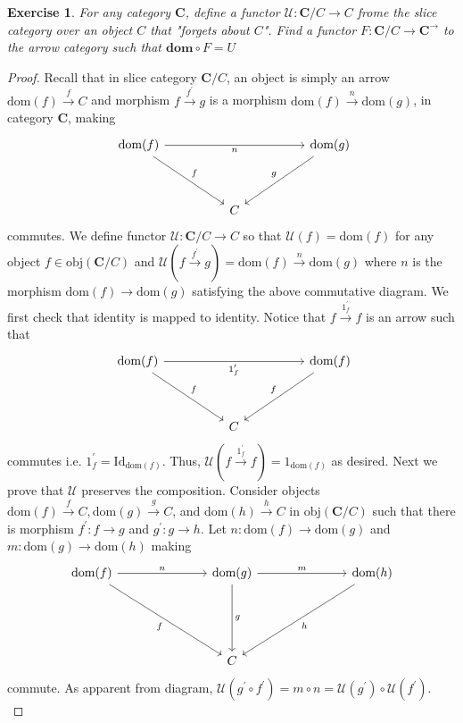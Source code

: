 \documentclass[a4paper, 11pt]{book}
\theoremstyle{plain}
\newtheorem{exercise}{Exercise}[chapter]
\theoremstyle{plain}
\newcommand{\mb}{\mathbf}
\newcommand{\arr}{\rightarrow}
\newcommand{\dom}{\text{dom}}
\newcommand{\p}{\prime}
\newcommand{\obj}{\text{obj}}
\newcommand{\id}{\text{Id}}
\newcommand{\mc}{\mathcal}
\newcommand{\warr}{\xrightarrow}
\begin{document}
  \begin{exercise}
    For any category $\mb{C}$, define a functor $\mc{U}:\mb{C}/C \arr C$ frome the slice category over an object $C$ that "forgets about $C$". Find a functor $F: \mb{C}/C \arr \mb{C}^\arr$ to the arrow category such that $\mb{dom} \circ F=U$
  \end{exercise}
  \begin{proof}
    Recall that in slice category $\mb{C}/C$, an object is simply an arrow $\dom(f) \warr{f} C$ and morphism $f \warr{f^\p} g$ is a morphism $\dom(f) \warr{n} \dom(g)$, in category $\mb{C}$, making  
    \[\begin{tikzcd}
      {\ \text{dom}(f)} &&&& { \text{dom}(g)} \\
      \\
      && { C}
      \arrow["f", from=1-1, to=3-3]
      \arrow["g"', from=1-5, to=3-3]
      \arrow["n"', from=1-1, to=1-5]
    \end{tikzcd}\]
    commutes. 
     We define functor $\mc{U}:\mb{C}/C \arr C$ so that $\mc{U}(f)= \dom(f)$ for any object $f \in \obj(\mb{C}/C)$ and $\mc{U}(f \warr{f^\p} g)=\dom(f) \warr{n} \dom(g)$ where $n$ is the morphism $\dom(f) \arr \dom(g)$ satisfying the above commutative diagram. We first check that identity is mapped to identity. Notice that $f \warr{1_f^\p} f$ is an arrow such that \[\begin{tikzcd}
      {\ \text{dom}(f)} &&&& { \text{dom}(f)} \\
      \\
      && { C}
      \arrow["f", from=1-1, to=3-3]
      \arrow["f"', from=1-5, to=3-3]
      \arrow["{1_f^\prime}"', from=1-1, to=1-5]
    \end{tikzcd}\]
    commutes i.e. $1_f^\p=\id_{\dom (f)}$. Thus, $\mc{U}(f \warr{1_f^\p} f)= 1_{\dom(f)}$ as desired. Next we prove that $\mc{U}$ preserves the composition. Consider objects $\dom(f) \warr{f} C, \dom(g) \warr{g} C$, and $\dom(h) \warr{h} C$ in $\obj(\mb{C}/C)$ such that there is morphism $f^\p:f \arr g$ and $g^\p: g \arr h$. Let $n:\dom(f) \arr \dom(g)$ and $m:\dom(g) \arr \dom(h)$ making 
    \[\begin{tikzcd}
      {\text{dom}(f)} &&& {\text{dom}(g)} &&& {\text{dom}(h)} \\
      \\
      \\
      &&& C
      \arrow["f"', from=1-1, to=4-4]
      \arrow["n", from=1-1, to=1-4]
      \arrow["g", from=1-4, to=4-4]
      \arrow["m", from=1-4, to=1-7]
      \arrow["h", from=1-7, to=4-4]
    \end{tikzcd}\]
    commute. As apparent from diagram, $\mc{U} (g^\p \circ f^\p)=m \circ n=\mc{U}(g^\p) \circ \mc{U}(f^\p)$.  \\


\end{proof}
\end{document}
